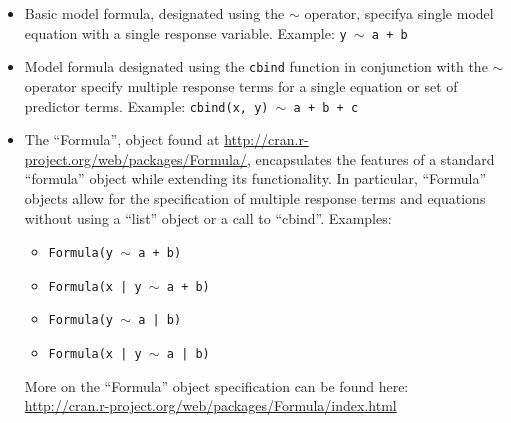 \documentclass{article}
\newcommand{\tweedly}[0]{$\sim${ }}
\begin{document}
\begin{itemize}

  \item Basic model formula, designated using the \tweedly operator, specifya single
    model equation with a single response variable. Example: 
    {\tt y \tweedly a + b}

  \item Model formula designated using the \verb+cbind+ function in conjunction
    with the \tweedly operator specify multiple response terms for a single
    equation or set of predictor terms. Example: 
    {\tt cbind(x, y) \tweedly a + b + c}

  \item The ``Formula'', object found at
    \url{http://cran.r-project.org/web/packages/Formula/}, encapsulates the
    features of a standard ``formula'' object while extending its functionality.
    In particular, ``Formula'' objects allow for the specification of multiple
    response terms and equations without using a ``list'' object or a call to
    ``cbind''. Examples:
    \begin{itemize}
      \item {\tt Formula(y \tweedly a + b)}
      \item {\tt Formula(x | y \tweedly a + b)}
      \item {\tt Formula(y \tweedly a | b)}
      \item {\tt Formula(x | y \tweedly a | b)}
   \end{itemize}

   More on the ``Formula'' object specification can be found here:\\
   \url{http://cran.r-project.org/web/packages/Formula/index.html}

\end{itemize}
\end{document}
